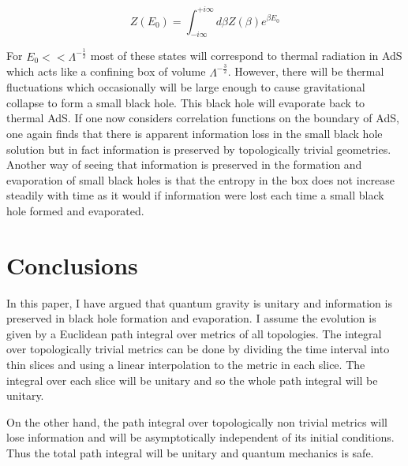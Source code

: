 \documentclass[aps,prd,groupedaddress,showpacs,12pt]{revtex4-1}
\begin{document}
\begin{equation}
Z(E_0)=\int_{-i\infty}^{+i\infty}d\beta Z(\beta)e^{\beta E_0}
\end{equation}

For $E_0 << \Lambda^{-\frac{1}{2}}$ most of these states will correspond to thermal radiation in AdS which acts like a confining box of volume $\Lambda^{-\frac{3}{2}}$. However, there will be thermal fluctuations which occasionally will be large enough to cause gravitational collapse to form a small black hole. This black hole will evaporate back to thermal AdS. If one now considers correlation functions on the boundary of AdS, one again finds that there is apparent information loss in the small black hole solution but in fact information is preserved by topologically trivial geometries. Another way of seeing that information is preserved in the formation and evaporation of small black holes is that the entropy in the box does not increase steadily with time as it would if information were lost each time a small black hole formed and evaporated. 


\section{Conclusions}

In this paper, I have argued that quantum gravity is unitary and information is preserved in black hole formation and evaporation. I assume the evolution is given by a Euclidean path integral over metrics of all topologies. The integral over topologically trivial metrics can be done by dividing the time interval into thin slices and using a linear interpolation to the metric in each slice. The integral over each slice will be unitary and so the whole path integral will be unitary. 

On the other hand, the path integral over topologically non trivial metrics will lose information and will be asymptotically independent of its initial conditions. Thus the total path integral will be unitary and quantum mechanics is safe. 
\end{document}
